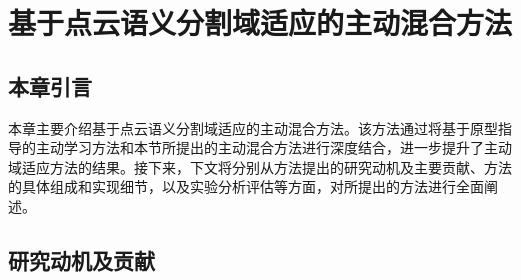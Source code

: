 \chapter{基于点云语义分割域适应的主动混合方法}
\thispagestyle{others}
\pagestyle{others}
\xiaosi

    \section{本章引言}
    本章主要介绍基于点云语义分割域适应的主动混合方法。该方法通过将基于原型指导的主动学习方法和本节所提出的主动混合方法进行深度结合，进一步提升了主动域适应方法的结果。接下来，下文将分别从方法提出的研究动机及主要贡献、方法的具体组成和实现细节，以及实验分析评估等方面，对所提出的方法进行全面阐述。 

    \section{研究动机及贡献}
